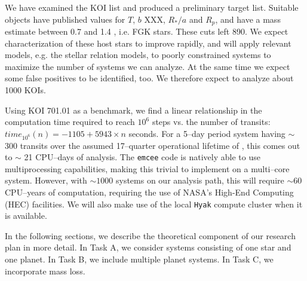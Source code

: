 \medskip
{\centerline{}}
\smallskip

We have examined the KOI list and produced a preliminary target list. Suitable objects have published values for $T$, $b$ XXX, $R_*/a$ and $R_p$, and have a mass estimate between 0.7 and 1.4 \msun, i.e. FGK stars. These cuts left
890.  We expect characterization of these host stars to improve rapidly, and will apply relevant models, e.g. the \cite{Torres08} stellar relation models, to poorly constrained systems to maximize the number of systems we can analyze. At the same time we expect some false positives to be identified, too. We therefore expect to analyze about 1000 KOIs.

\medskip
{\centerline{}}
\smallskip


Using KOI 701.01 as a benchmark, we find a linear relationship in the
computation time required to reach $10^6$ steps vs. the number of
transits: $time_{10^6}(n) = -1105 + 5943 \times n$ seconds.
%
For a 5--day period system having $\sim$ 300 transits over the assumed
17--quarter operational lifetime of \kepler, this comes out to $\sim$
21 CPU--days of analysis.  The {\tt emcee} code is natively able to
use multiprocessing capabilities, making this trivial to implement on
a multi--core system.  However, with $\sim 1000$ systems on our
analysis path, this will require $\sim 60$ CPU--years of computation,
requiring the use of NASA's High-End Computing (HEC) facilities.  We
will also make use of the local {\tt Hyak} compute cluster when it is
available.

\medskip
{\centerline{}}
\smallskip

In the following sections, we describe the theoretical component of
our research plan in more detail.  In Task A, we consider systems
consisting of one star and one planet.  In Task B, we include multiple
planet systems. In Task C, we incorporate mass loss.

